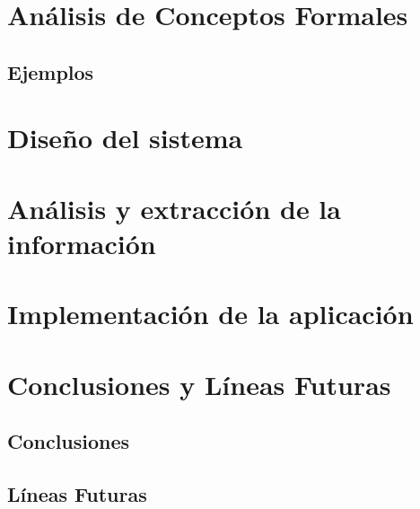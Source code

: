 \documentclass[12pt, a4paper, twoside]{article}
\begin{document}
\section{Análisis de Conceptos Formales}

\newpage\cleardoublepage

\subsection{Ejemplos}

\newpage\cleardoublepage



\section{Diseño del sistema}

\newpage\cleardoublepage


\newpage\cleardoublepage


\section{Análisis y extracción de la información}

\newpage\cleardoublepage



\section{Implementación de la aplicación}

\newpage\cleardoublepage

\newpage\cleardoublepage




\section{Conclusiones y Líneas Futuras}
\subsection{Conclusiones}

\newpage\cleardoublepage

\subsection{Líneas Futuras}

\newpage\cleardoublepage
\end{document}
